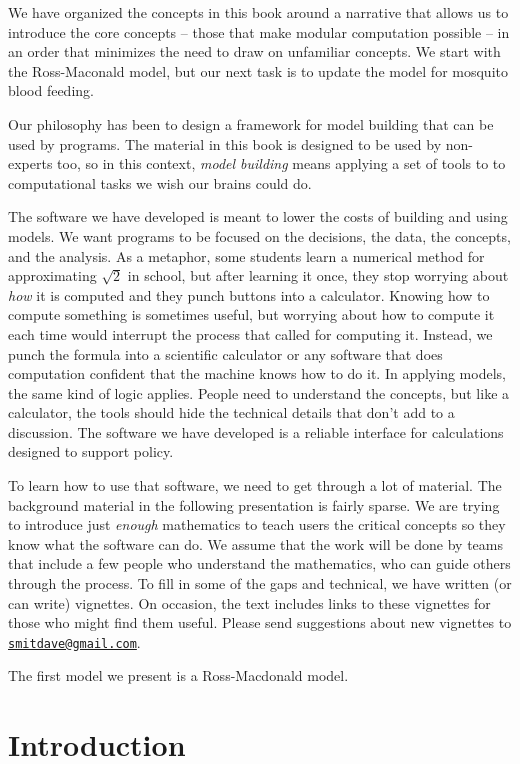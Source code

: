 \documentclass[
]{book}
\begin{document}
We have organized the concepts in this book around a narrative that allows us to introduce the core concepts -- those that make modular computation possible -- in an order that minimizes the need to draw on unfamiliar concepts. We start with the Ross-Maconald model, but our next task is to update the model for mosquito blood feeding.

Our philosophy has been to design a framework for model building that can be used by programs. The material in this book is designed to be used by non-experts too, so in this context, \emph{model building} means applying a set of tools to to computational tasks we wish our brains could do.

The software we have developed is meant to lower the costs of building and using models. We want programs to be focused on the decisions, the data, the concepts, and the analysis. As a metaphor, some students learn a numerical method for approximating \(\sqrt{2}\) in school, but after learning it once, they stop worrying about \emph{how} it is computed and they punch buttons into a calculator. Knowing how to compute something is sometimes useful, but worrying about how to compute it each time would interrupt the process that called for computing it. Instead, we punch the formula into a scientific calculator or any software that does computation confident that the machine knows how to do it. In applying models, the same kind of logic applies. People need to understand the concepts, but like a calculator, the tools should hide the technical details that don't add to a discussion. The software we have developed is a reliable interface for calculations designed to support policy.

To learn how to use that software, we need to get through a lot of material. The background material in the following presentation is fairly sparse. We are trying to introduce just \emph{enough} mathematics to teach users the critical concepts so they know what the software can do. We assume that the work will be done by teams that include a few people who understand the mathematics, who can guide others through the process. To fill in some of the gaps and technical, we have written (or can write) vignettes. On occasion, the text includes links to these vignettes for those who might find them useful. Please send suggestions about new vignettes to \href{mailto:smitdave@gmail.com}{\nolinkurl{smitdave@gmail.com}}.

The first model we present is a Ross-Macdonald model.

\hypertarget{part-introduction}{%
\part{Introduction}\label{part-introduction}}
\end{document}
